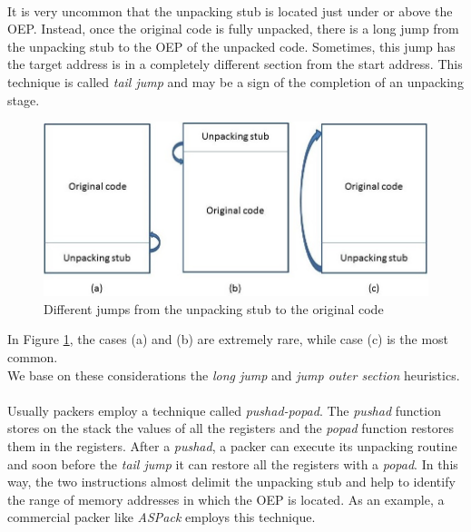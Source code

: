 \paragraph{}
It is very uncommon that the unpacking stub is located just under or above the \ac{OEP}. Instead, once the original code is fully unpacked, there is a long jump from the unpacking stub to the \ac{OEP} of the unpacked code. Sometimes, this jump has the target address is in a completely different section from the start address. This technique is called \textit{tail jump} and may be a sign of the completion of an unpacking stage. 
\begin{figure}[!ht]
	\begin{center}
   		\includegraphics [width=\textwidth]{./pictures/Original Code And Unpacking Stub.jpg}
	\end{center}
	\caption{Different jumps from the unpacking stub to the original code}
	\label{Original Code And Unpacking Stub}
\end{figure}
In Figure \ref{Original Code And Unpacking Stub}, the cases (a) and (b) are extremely rare, while case (c) is the most common.\\
We base on these considerations the \textit{long jump} and \textit{jump outer section} heuristics.
\paragraph{}
Usually packers employ a technique called \textit{pushad-popad}. The \textit{pushad} function stores on the stack the values of all the registers and the \textit{popad} function restores them in the registers. After a \textit{pushad}, a packer can execute its unpacking routine and soon before the \textit{tail jump} it can restore all the registers with a \textit{popad}. In this way, the two instructions almost delimit the unpacking stub and help to identify the range of memory addresses in which the \ac{OEP} is located. As an example, a commercial packer like \textit{ASPack} employs this technique.
